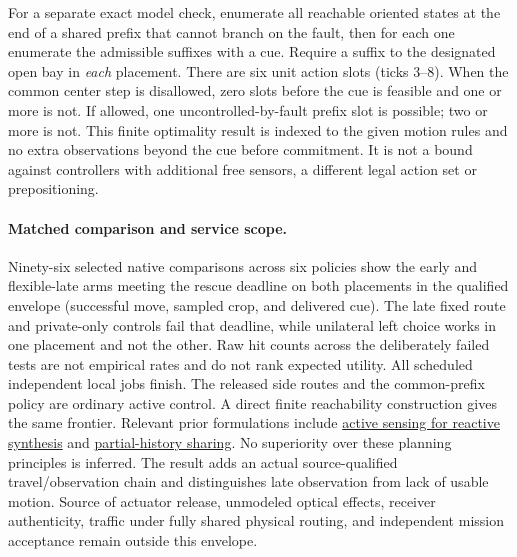 \documentclass[11pt]{article}
\begin{document}
For a separate exact model check, enumerate all reachable oriented
states at the end of a shared prefix that cannot branch on the fault,
then for each one enumerate the admissible suffixes with a cue.
Require a suffix to the designated open bay in \emph{each} placement.
There are six unit action slots (ticks 3--8). When the common center
step is disallowed, zero slots before the cue is feasible and one or
more is not. If allowed, one uncontrolled-by-fault prefix slot is
possible; two or more is not. This finite optimality result is indexed
to the given motion rules and no extra observations beyond the cue
before commitment. It is not a bound against controllers with
additional free sensors, a different legal action set or prepositioning.

\paragraph{Matched comparison and service scope.}
Ninety-six selected native comparisons across six policies show the
early and flexible-late arms meeting the rescue deadline on both
placements in the qualified envelope (successful move, sampled crop,
and delivered cue). The late fixed route and private-only controls
fail that deadline, while unilateral left choice works in one
placement and not the other. Raw hit counts across the deliberately
failed tests are not empirical rates and do not rank expected utility.
All scheduled independent local jobs finish. The released side routes
and the common-prefix policy are ordinary active control. A direct
finite reachability construction gives the same frontier. Relevant
prior formulations include
\href{https://arxiv.org/abs/1410.0083}{active sensing for reactive synthesis}
and
\href{https://arxiv.org/abs/1209.1695}{partial-history sharing}.
No superiority over these planning principles is inferred. The result
adds an actual source-qualified travel/observation chain and distinguishes
late observation from lack of usable motion. Source of actuator release,
unmodeled optical effects, receiver authenticity, traffic under
fully shared physical routing, and independent mission acceptance remain
outside this envelope.
\end{document}
